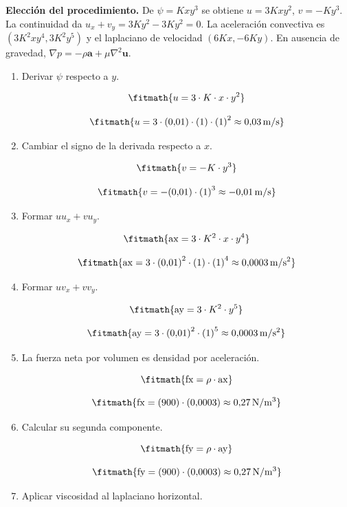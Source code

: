 \noindent\textbf{Elección del procedimiento.} De $\psi=Kxy^3$ se obtiene $u=3Kxy^2$, $v=-Ky^3$. La continuidad da $u_x+v_y=3Ky^2-3Ky^2=0$. La aceleración convectiva es $(3K^2xy^4,3K^2y^5)$ y el laplaciano de velocidad $(6Kx,-6Ky)$. En ausencia de gravedad, $\nabla p=-\rho\boldsymbol a+\mu\nabla^2\boldsymbol u$.

\begin{enumerate}

\item Derivar $\psi$ respecto a $y$.

\[\fitmath{u=3\cdot K\cdot x\cdot {y}^{2}}\]

\[\fitmath{u=3\cdot (0{,}01)\cdot (1)\cdot {(1)}^{2}\approx 0{,}03\,\mathrm{m/s}}\]

\item Cambiar el signo de la derivada respecto a $x$.

\[\fitmath{v=-K\cdot {y}^{3}}\]

\[\fitmath{v=-(0{,}01)\cdot {(1)}^{3}\approx -0{,}01\,\mathrm{m/s}}\]

\item Formar $uu_x+vu_y$.

\[\fitmath{\mathrm{ax}=3\cdot {K}^{2}\cdot x\cdot {y}^{4}}\]

\[\fitmath{\mathrm{ax}=3\cdot {(0{,}01)}^{2}\cdot (1)\cdot {(1)}^{4}\approx 0{,}0003\,\mathrm{m/s^{2}}}\]

\item Formar $uv_x+vv_y$.

\[\fitmath{\mathrm{ay}=3\cdot {K}^{2}\cdot {y}^{5}}\]

\[\fitmath{\mathrm{ay}=3\cdot {(0{,}01)}^{2}\cdot {(1)}^{5}\approx 0{,}0003\,\mathrm{m/s^{2}}}\]

\item La fuerza neta por volumen es densidad por aceleración.

\[\fitmath{\mathrm{fx}=\rho\cdot \mathrm{ax}}\]

\[\fitmath{\mathrm{fx}=(900)\cdot (0{,}0003)\approx 0{,}27\,\mathrm{N/m^{3}}}\]

\item Calcular su segunda componente.

\[\fitmath{\mathrm{fy}=\rho\cdot \mathrm{ay}}\]

\[\fitmath{\mathrm{fy}=(900)\cdot (0{,}0003)\approx 0{,}27\,\mathrm{N/m^{3}}}\]

\item Aplicar viscosidad al laplaciano horizontal.


\end{enumerate}
